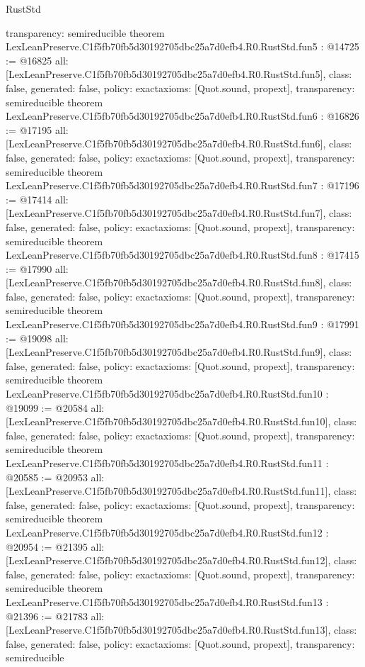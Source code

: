 \begin{lexlean}{RustStd}
\begin{coremodule}
{  transparency: semireducible
}
theorem LexLeanPreserve.C1f5fb70fb5d30192705dbc25a7d0efb4.R0.RustStd.fun5 : @14725 := @16825 {
  all: [LexLeanPreserve.C1f5fb70fb5d30192705dbc25a7d0efb4.R0.RustStd.fun5],
  class: false,
  generated: false,
  policy: exact{axioms: [Quot.sound, propext]},
  transparency: semireducible
}
theorem LexLeanPreserve.C1f5fb70fb5d30192705dbc25a7d0efb4.R0.RustStd.fun6 : @16826 := @17195 {
  all: [LexLeanPreserve.C1f5fb70fb5d30192705dbc25a7d0efb4.R0.RustStd.fun6],
  class: false,
  generated: false,
  policy: exact{axioms: [Quot.sound, propext]},
  transparency: semireducible
}
theorem LexLeanPreserve.C1f5fb70fb5d30192705dbc25a7d0efb4.R0.RustStd.fun7 : @17196 := @17414 {
  all: [LexLeanPreserve.C1f5fb70fb5d30192705dbc25a7d0efb4.R0.RustStd.fun7],
  class: false,
  generated: false,
  policy: exact{axioms: [Quot.sound, propext]},
  transparency: semireducible
}
theorem LexLeanPreserve.C1f5fb70fb5d30192705dbc25a7d0efb4.R0.RustStd.fun8 : @17415 := @17990 {
  all: [LexLeanPreserve.C1f5fb70fb5d30192705dbc25a7d0efb4.R0.RustStd.fun8],
  class: false,
  generated: false,
  policy: exact{axioms: [Quot.sound, propext]},
  transparency: semireducible
}
theorem LexLeanPreserve.C1f5fb70fb5d30192705dbc25a7d0efb4.R0.RustStd.fun9 : @17991 := @19098 {
  all: [LexLeanPreserve.C1f5fb70fb5d30192705dbc25a7d0efb4.R0.RustStd.fun9],
  class: false,
  generated: false,
  policy: exact{axioms: [Quot.sound, propext]},
  transparency: semireducible
}
theorem LexLeanPreserve.C1f5fb70fb5d30192705dbc25a7d0efb4.R0.RustStd.fun10 : @19099 := @20584 {
  all: [LexLeanPreserve.C1f5fb70fb5d30192705dbc25a7d0efb4.R0.RustStd.fun10],
  class: false,
  generated: false,
  policy: exact{axioms: [Quot.sound, propext]},
  transparency: semireducible
}
theorem LexLeanPreserve.C1f5fb70fb5d30192705dbc25a7d0efb4.R0.RustStd.fun11 : @20585 := @20953 {
  all: [LexLeanPreserve.C1f5fb70fb5d30192705dbc25a7d0efb4.R0.RustStd.fun11],
  class: false,
  generated: false,
  policy: exact{axioms: [Quot.sound, propext]},
  transparency: semireducible
}
theorem LexLeanPreserve.C1f5fb70fb5d30192705dbc25a7d0efb4.R0.RustStd.fun12 : @20954 := @21395 {
  all: [LexLeanPreserve.C1f5fb70fb5d30192705dbc25a7d0efb4.R0.RustStd.fun12],
  class: false,
  generated: false,
  policy: exact{axioms: [Quot.sound, propext]},
  transparency: semireducible
}
theorem LexLeanPreserve.C1f5fb70fb5d30192705dbc25a7d0efb4.R0.RustStd.fun13 : @21396 := @21783 {
  all: [LexLeanPreserve.C1f5fb70fb5d30192705dbc25a7d0efb4.R0.RustStd.fun13],
  class: false,
  generated: false,
  policy: exact{axioms: [Quot.sound, propext]},
  transparency: semireducible
}
\end{coremodule}
\end{lexlean}
